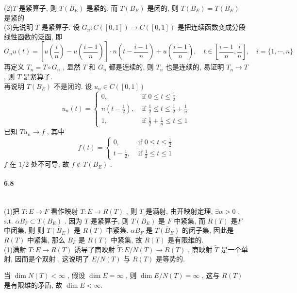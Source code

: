\documentclass[UTF8]{ctexart}
\begin{document}
        \noindent(2)\quad $T$ 是紧算子, 则 $\overline{T(B_E)}$ 是紧的, 而 $T(B_E)$ 是闭的, 则 $T(B_E) = \overline{T(B_E)}$ 是紧的\\

        \noindent(3)\quad 先说明 $T$ 是紧算子. 设 $G_n : C([0, 1]) \rightarrow C([0, 1])$ 是把连续函数变成分段线性函数的泛函, 即 
        \[
            G_n u(t) = [u(\frac{i}{n}) - u(\frac{i - 1}{n})] \cdot n(t - \frac{i - 1}{n}) + u(\frac{i - 1}{n}) ,\quad t \in [\frac{i - 1}{n}, \frac{i}{n}], \quad i = \{1, \cdots ,n\}
        \]
        再定义 $T_n = T \circ G_n$ , 显然 $T$ 和 $G_n$ 都是连续的, 则 $T_n$ 也是连续的, 易证明 $T_n \rightarrow T$ , 则 $T$ 是紧算子.\\

        再说明 $T(B_E)$ 不是闭的. 设 $u_n \in C([0, 1])$ 
        \[
            u_n(t) = 
            \begin{cases}
                0, &\text{ if } 0 \le t \le \frac{1}{2}\\
                n(t - \frac{1}{2}), &\text{ if } \frac{1}{2} \le t \le \frac{1}{2} + \frac{1}{n}\\
                1, &\text{ if } \frac{1}{2} + \frac{1}{n} \le t \le 1
            \end{cases}
        \]
        已知 $T u_n \rightarrow f$ , 其中 
        \[
            f(t) = 
            \begin{cases}
                0, &\text{ if } 0 \le t \le \frac{1}{2}\\
                t - \frac{1}{2}, &\text{ if } \frac{1}{2} \le t \le 1
            \end{cases}
        \]
        $f$ 在 $1/2$ 处不可导, 故 $f \notin T(B_E)$ .\\

    \paragraph{6.8}\quad\\
        \noindent(1)\quad 把 $T : E \rightarrow F$ 看作映射 $T : E \rightarrow R(T)$ , 则 $T$ 是满射, 由开映射定理, $\exists \alpha > 0$ , $\text{s.t. } \alpha B_F \subset T(B_E)$ .
        因为 $T$ 是紧算子, 则 $\overline{T(B_E)}$ 是 $F$ 中紧集, 而 $R(T)$ 是$F$ 中闭集, 则 则 $\overline{T(B_E)}$ 是 $R(T)$ 中紧集.
        $\alpha B_F$ 是 $\overline{T(B_E)}$ 的闭子集, 因此是 $R(T)$ 中紧集, 那么 $B_F$ 是 $R(T)$ 中紧集, 故 $R(T)$ 是有限维的.\\

        \noindent(1)\quad 满射 $T : E \rightarrow R(T)$ 诱导了商映射 $\tilde{T} : E / N(T) \rightarrow R(T)$ , 商映射 $\tilde{T}$ 是一个单射, 因而是个双射 . 这说明了 $E / N(T)$ 与 $R(T)$ 是等势的. 
        
        当 $\dim N(T) < \infty$ , 假设 $\dim E = \infty$ , 则 $\dim E / N(T) = \infty$ , 这与 $R(T)$ 是有限维的矛盾, 故 $\dim E < \infty$.
\end{document}

